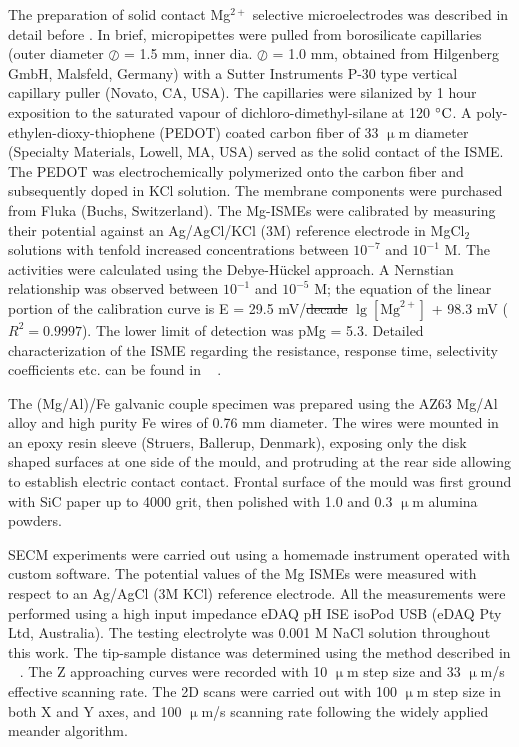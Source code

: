 \documentclass[3p]{elsarticle}
\providecommand{\DIFadd}[1]{{\protect\color{blue}#1}} %
\providecommand{\DIFdel}[1]{{\protect\color{red}\sout{#1}}}                      %
\providecommand{\DIFaddbegin}{} %
\providecommand{\DIFaddend}{} %
\providecommand{\DIFdelbegin}{} %
\providecommand{\DIFdelend}{} %
\begin{document}
The preparation of solid contact Mg$^{2+}$ selective microelectrodes was described in detail before \cite{overmg3}. In brief, micropipettes were pulled from borosilicate capillaries (outer diameter $\oslash$ = 1.5 mm, inner dia. $\oslash$ = 1.0 mm, obtained from Hilgenberg GmbH, Malsfeld, Germany) with a Sutter Instruments P-30 type vertical capillary puller (Novato, CA, USA). The capillaries were silanized by 1 hour exposition to the saturated vapour of dichloro-dimethyl-silane at 120 $\celsius$. A poly-ethylen-dioxy-thiophene (PEDOT) coated carbon fiber of 33 $\upmu$m diameter (Specialty Materials, Lowell, MA, USA) served as the solid contact of the ISME. The PEDOT was electrochemically polymerized onto the carbon fiber and subsequently doped in KCl solution. The membrane components were purchased from Fluka (Buchs, Switzerland).
The Mg-ISMEs were calibrated by measuring their potential against an Ag/AgCl/KCl (3M) reference electrode in MgCl$_2$ solutions with tenfold increased concentrations between $10^{-7}$ and $10^{-1}$ M. The activities were calculated using the Debye-Hückel approach. A Nernstian relationship was observed between $10^{-1}$ and $10^{-5}$ M; the equation of the linear portion of the calibration curve is E = 29.5 mV/\DIFdelbegin \DIFdel{decade }\DIFdelend \DIFaddbegin \DIFadd{$\lg [\textrm{Mg}^{2+}]$ }\DIFaddend + 98.3 mV ($R^2=0.9997$). The lower limit of detection was pMg = 5.3. \DIFaddbegin \DIFadd{Detailed characterization of the ISME regarding the resistance, response time, selectivity coefficients etc. can be found in \mbox{%
\cite{overmg3, mihaelamg}}%
.
}\DIFaddend 

The (Mg/Al)/Fe galvanic couple specimen was prepared using the AZ63 Mg/Al alloy and high purity Fe wires of 0.76 mm diameter. The wires were mounted in an epoxy resin sleeve (Struers, Ballerup, Denmark), exposing only the disk shaped surfaces at one side of the mould, and protruding at the rear side allowing to establish electric contact contact. Frontal surface of the mould was first ground with SiC paper up to 4000 grit, then polished with 1.0 and 0.3 $\upmu$m alumina powders.

SECM experiments were carried out using a homemade instrument operated with custom software. The potential values of the Mg ISMEs were measured \DIFaddbegin \DIFadd{with }\DIFaddend respect to an Ag/AgCl (3M KCl) reference electrode. All the measurements were performed using a high input impedance eDAQ pH ISE isoPod USB (eDAQ Pty Ltd, Australia). \DIFaddbegin \DIFadd{The testing electrolyte was 0.001 M NaCl solution throughout this work. The tip-sample distance was determined using the method described in \mbox{%
\cite{overmg3}}%
. The Z approaching curves were recorded with 10 $\upmu$m step size and 33 $\upmu$m/s effective scanning rate. The 2D scans were carried out with 100 $\upmu$m step size in both X and Y axes, and 100 $\upmu$m/s scanning rate following the widely applied meander algorithm.
}\DIFaddend 
\end{document}
